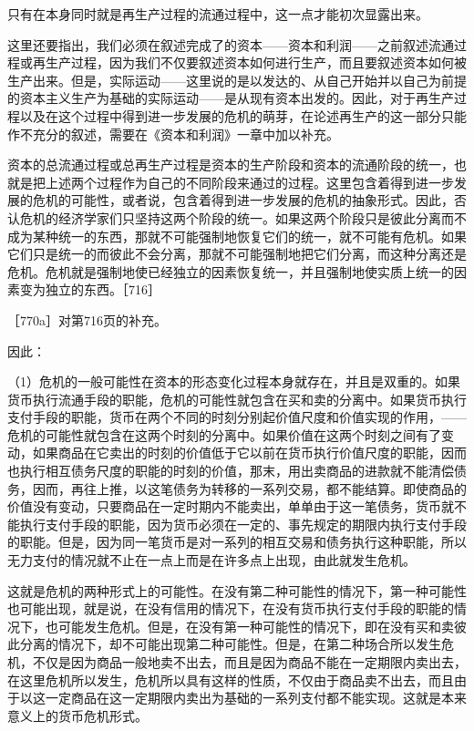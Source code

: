 只有在本身同时就是再生产过程的流通过程中，这一点才能初次显露出来。

这里还要指出，我们必须在叙述完成了的资本——资本和利润——之前叙述流通过程或再生产过程，因为我们不仅要叙述资本如何进行生产，而且要叙述资本如何被生产出来。但是，实际运动——这里说的是以发达的、从自己开始并以自己为前提的资本主义生产为基础的实际运动——是从现有资本出发的。因此，对于再生产过程以及在这个过程中得到进一步发展的危机的萌芽，在论述再生产的这一部分只能作不充分的叙述，需要在《资本和利润》一章中加以补充。

资本的总流通过程或总再生产过程是资本的生产阶段和资本的流通阶段的统一，也就是把上述两个过程作为自己的不同阶段来通过的过程。这里包含着得到进一步发展的危机的可能性，或者说，包含着得到进一步发展的危机的抽象形式。因此，否认危机的经济学家们只坚持这两个阶段的统一。如果这两个阶段只是彼此分离而不成为某种统一的东西，那就不可能强制地恢复它们的统一，就不可能有危机。如果它们只是统一的而彼此不会分离，那就不可能强制地把它们分离，而这种分离还是危机。危机就是强制地使已经独立的因素恢复统一，并且强制地使实质上统一的因素变为独立的东西。［716］


［770a］对第716页的补充。

因此：

（1）危机的一般可能性在资本的形态变化过程本身就存在，并且是双重的。如果货币执行流通手段的职能，危机的可能性就包含在买和卖的分离中。如果货币执行支付手段的职能，货币在两个不同的时刻分别起价值尺度和价值实现的作用，——危机的可能性就包含在这两个时刻的分离中。如果价值在这两个时刻之间有了变动，如果商品在它卖出的时刻的价值低于它以前在货币执行价值尺度的职能，因而也执行相互债务尺度的职能的时刻的价值，那末，用出卖商品的进款就不能清偿债务，因而，再往上推，以这笔债务为转移的一系列交易，都不能结算。即使商品的价值没有变动，只要商品在一定时期内不能卖出，单单由于这一笔债务，货币就不能执行支付手段的职能，因为货币必须在一定的、事先规定的期限内执行支付手段的职能。但是，因为同一笔货币是对一系列的相互交易和债务执行这种职能，所以无力支付的情况就不止在一点上而是在许多点上出现，由此就发生危机。

这就是危机的两种形式上的可能性。在没有第二种可能性的情况下，第一种可能性也可能出现，就是说，在没有信用的情况下，在没有货币执行支付手段的职能的情况下，也可能发生危机。但是，在没有第一种可能性的情况下，即在没有买和卖彼此分离的情况下，却不可能出现第二种可能性。但是，在第二种场合所以发生危机，不仅是因为商品一般地卖不出去，而且是因为商品不能在一定期限内卖出去，在这里危机所以发生，危机所以具有这样的性质，不仅由于商品卖不出去，而且由于以这一定商品在这一定期限内卖出为基础的一系列支付都不能实现。这就是本来意义上的货币危机形式。


